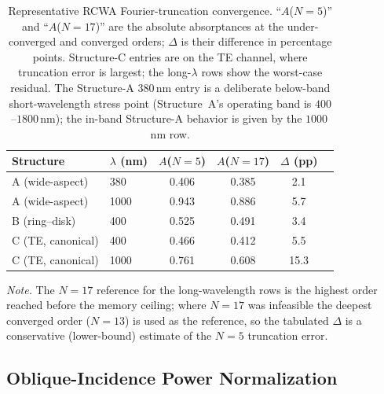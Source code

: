 \documentclass[11pt]{article}
\begin{document}
\begin{table}[htbp]\centering\small
\caption{Representative RCWA Fourier-truncation convergence. ``$A$($N{=}5$)''
and ``$A$($N{=}17$)'' are the absolute absorptances at the under-converged and
converged orders; $\Delta$ is their difference in percentage points. Structure-C
entries are on the TE channel, where truncation error is largest; the long-$\lambda$
rows show the worst-case residual. The Structure-A $380$\,nm entry is a deliberate
below-band short-wavelength stress point (Structure~A's operating band is
$400$--$1800$\,nm); the in-band Structure-A behavior is given by the $1000$\,nm row.}
\label{tab:si_convergence}
\begin{tabular}{llcccc}\toprule
\textbf{Structure} & \textbf{$\lambda$ (nm)} & \textbf{$A$($N{=}5$)} & \textbf{$A$($N{=}17$)} & \textbf{$\Delta$ (pp)}\\\midrule
A (wide-aspect)  & 380  & 0.406 & 0.385 & 2.1\\
A (wide-aspect)  & 1000 & 0.943 & 0.886 & 5.7\\
B (ring--disk)   & 400  & 0.525 & 0.491 & 3.4\\
C (TE, canonical)& 400  & 0.466 & 0.412 & 5.5\\
C (TE, canonical)& 1000 & 0.761 & 0.608 & 15.3\\\bottomrule
\end{tabular}
\end{table}

\noindent\textit{Note.} The $N=17$ reference for the long-wavelength rows is the
highest order reached before the memory ceiling; where $N=17$ was infeasible the
deepest converged order ($N=13$) is used as the reference, so the tabulated
$\Delta$ is a conservative (lower-bound) estimate of the $N=5$ truncation error.

\subsection*{Oblique-Incidence Power Normalization}
\end{document}
